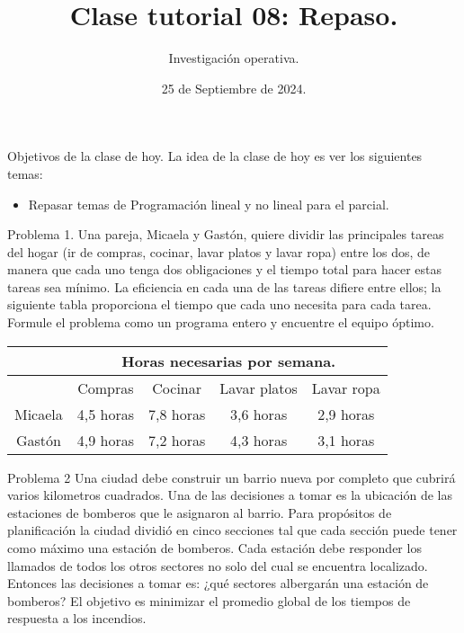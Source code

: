 \documentclass{beamer}
\title[]{Clase tutorial 08: Repaso.}
\date{25 de Septiembre de 2024.}
\author[]{ Investigación operativa.}
\institute{Universidad de San Andrés}
\begin{document}
\maketitle

\begin{frame}{Objetivos de la clase de hoy.}
  La idea de la clase de hoy es ver los siguientes temas:
  \begin{itemize}
    \item Repasar temas de Programación lineal y no lineal para el parcial.
  \end{itemize}
\end{frame}


\begin{frame}[fragile]{Problema 1.}
  Una pareja, Micaela y Gastón, quiere dividir las principales tareas del hogar (ir de compras,
  cocinar, lavar platos y lavar ropa) entre los dos, de manera que cada uno tenga dos
  obligaciones y el tiempo total para hacer estas tareas sea mínimo. La eficiencia en cada
  una de las tareas difiere entre ellos; la siguiente tabla proporciona el tiempo que cada uno
  necesita para cada tarea. Formule el problema como un programa entero y encuentre el
  equipo óptimo.

  \begin{center}
    \begin{adjustbox}{width = 0.85 \textwidth}
        \begin{tabular}{|c |c |c|c|c|}
          \hline
          & \multicolumn{4}{|c|}{Horas necesarias por semana.} \\ 
          \hline
          & Compras & Cocinar & Lavar platos & Lavar ropa \\
          \hline
          Micaela & 4,5 horas & 7,8 horas & 3,6 horas & 2,9 horas \\ 
          Gastón & 4,9 horas & 7,2 horas & 4,3 horas & 3,1 horas \\
          \hline 
        \end{tabular}
    \end{adjustbox}
  \end{center}

  
\end{frame}

\begin{frame}[fragile]{Problema 2}
  Una ciudad debe construir un barrio nueva por completo que cubrirá varios kilometros cuadrados.
  Una de las decisiones a tomar es la ubicación de las estaciones de bomberos que le asignaron al barrio.
  Para propósitos de planificación la ciudad dividió en cinco secciones tal que cada sección puede tener como máximo una estación de bomberos.
  Cada estación debe responder los llamados de todos los otros sectores no solo del cual se encuentra localizado.
  Entonces las decisiones a tomar es: ¿qué sectores albergarán una estación de bomberos?
  El objetivo es minimizar el promedio global de los tiempos de respuesta a los incendios.
\end{frame}
\end{document}
